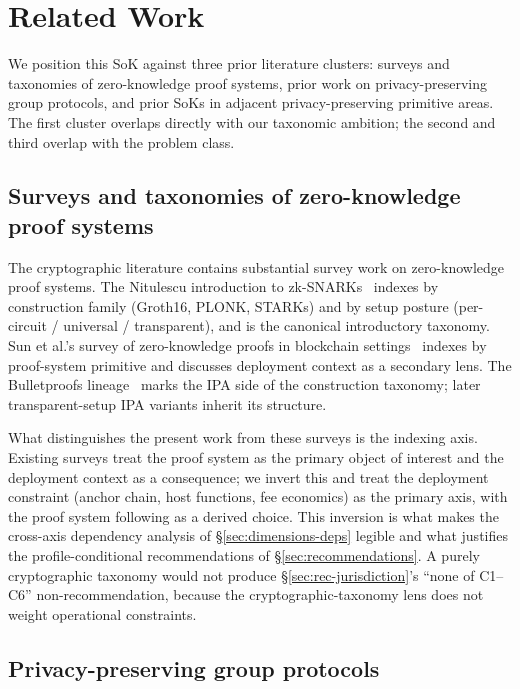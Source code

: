 \section{Related Work}
\label{sec:related}

We position this SoK against three prior literature clusters: surveys
and taxonomies of zero-knowledge proof systems, prior work on
privacy-preserving group protocols, and prior SoKs in adjacent
privacy-preserving primitive areas. The first cluster overlaps
directly with our taxonomic ambition; the second and third overlap
with the problem class.

\subsection{Surveys and taxonomies of zero-knowledge proof systems}

The cryptographic literature contains substantial survey work on
zero-knowledge proof systems. The Nitulescu introduction to
zk-SNARKs~\cite{nitulescu-2020-snarks} indexes by construction
family (Groth16, PLONK, STARKs) and by setup posture
(per-circuit / universal / transparent), and is the canonical
introductory taxonomy. Sun et al.'s survey of zero-knowledge proofs
in blockchain settings~\cite{sun-2021-zkp-blockchain} indexes by
proof-system primitive and discusses deployment context as a
secondary lens.
The Bulletproofs lineage~\cite{bunz-2018-bulletproofs} marks the IPA
side of the construction taxonomy; later transparent-setup IPA
variants inherit its structure.

What distinguishes the present work from these surveys is the
indexing axis. Existing surveys treat the proof system as the
primary object of interest and the deployment context as a
consequence; we invert this and treat the deployment constraint
(anchor chain, host functions, fee economics) as the primary axis,
with the proof system following as a derived choice. This inversion
is what makes the cross-axis dependency analysis of
\S\ref{sec:dimensions-deps} legible and what justifies the
profile-conditional recommendations of
\S\ref{sec:recommendations}. A purely cryptographic taxonomy would
not produce \S\ref{sec:rec-jurisdiction}'s ``none of C1--C6''
non-recommendation, because the cryptographic-taxonomy lens does not
weight operational constraints.

\subsection{Privacy-preserving group protocols}


